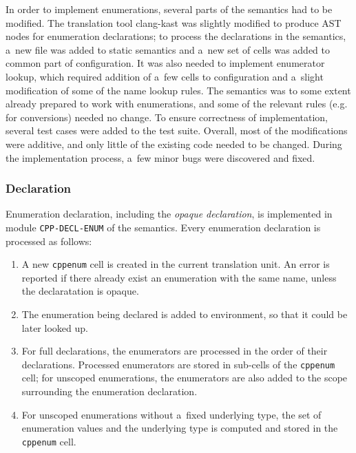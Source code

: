 \documentclass{fithesis3}
\begin{document}
In order to implement enumerations, several parts of the semantics had to be modified. The translation tool clang-kast was slightly modified to produce AST nodes for enumeration declarations; to process the declarations in the semantics, a~new file was added to static semantics and a~new set of cells was added to common part of configuration. It was also needed to implement enumerator lookup, which required addition of a~few cells to configuration and a~slight modification of some of the name lookup rules. The semantics was to some extent already prepared to work with enumerations, and some of the relevant rules (e.g. for conversions) needed no change. To ensure correctness of implementation, several test cases were added to the test suite. Overall, most of the modifications were additive, and only little of the existing code needed to be changed. During the implementation process, a~few minor bugs were discovered and fixed. 


\subsubsection{Declaration}

Enumeration declaration, including the \textit{opaque declaration}, is implemented in module \texttt{CPP-DECL-ENUM} of the semantics.
Every enumeration declaration is processed as follows:
\begin{enumerate}
\item A new \texttt{cppenum} cell is created in the current translation unit. An error is reported if there already exist an enumeration with the same name, unless the declaratation is opaque.
\item The enumeration being declared is added to environment, so that it could be later looked up.
\item For full declarations, the enumerators are processed in the order of their declarations. Processed enumerators are stored in sub-cells of the \texttt{cppenum} cell; for unscoped enumerations, the enumerators are also added to the scope surrounding the enumeration declaration.
\item For unscoped enumerations without a~fixed underlying type, the set of enumeration values and the underlying type is computed and stored in the \texttt{cppenum} cell.
\end{enumerate}
\end{document}
